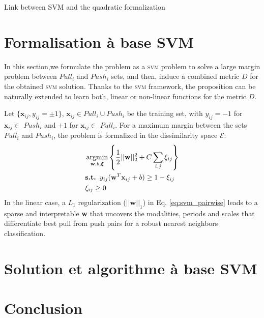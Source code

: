 Link between SVM and the quadratic formalization

\section*{Formalisation à base SVM}
In this section,we formulate the problem as a \textsc{svm} problem to solve a large margin problem between $Pull_i$ and $Push_i$ sets, and then, induce a combined metric $D$ for the obtained \textsc{svm} solution. Thanks to the \textsc{svm} framework, the proposition can be naturally extended to learn both, linear or non-linear functions for the metric $D$.

Let $\{\textbf{x}_{ij}, y_{ij} = \pm 1\}$, $\textbf{x}_{ij} \in Pull_i \cup Push_i$ be the training set, with $y_{ij} = -1$ for $\textbf{x}_{ij} \in$ $Push_i$ and $+1$ for $\textbf{x}_{ij} \in$ $Pull_i$. For a maximum margin between the sets $Pull_i$ and $Push_i$, the problem is formalized in the dissimilarity space $\mathcal{E}$:
\begin{equation}
\begin{aligned}
& \argmin_{\textbf{w},b,\boldsymbol{\xi}} \left\lbrace \frac{1}{2}||\textbf{w}||_2^2 + C \sum\limits_{i,j} \xi_{ij}\right\rbrace  \label{eq:svm_pairwise}\\
&\textbf{s.t. } y_{ij}(\textbf{w}^T \textbf{x}_{ij} + b) \geq 1-\xi_{ij} \\
&\xi_{ij} \geq 0
\end{aligned}
\end{equation}
\noindent In the linear case, a $L_1$ regularization ($||\textbf{w}||_1$) in Eq. \ref{eq:svm_pairwise} leads to a sparse and interpretable \textbf{w} that uncovers the modalities, periods and scales that differentiate best pull from push pairs for a robust nearest neighbors classification.

\section*{Solution et algorithme à base SVM}


\section*{Conclusion}